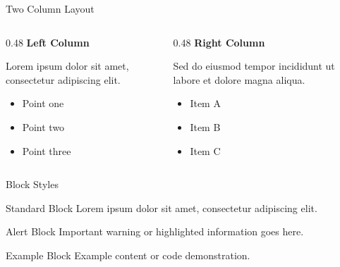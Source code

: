 \documentclass[aspectratio=169]{beamer}
\begin{document}
\begin{frame}{Two Column Layout}
  
  \begin{columns}[T]
    \begin{column}{0.48\textwidth}
      \textbf{Left Column}
      
      Lorem ipsum dolor sit amet, consectetur adipiscing elit.
      
      \begin{itemize}
        \item Point one
        \item Point two
        \item Point three
      \end{itemize}
    \end{column}
    \begin{column}{0.48\textwidth}
      \textbf{Right Column}
      
      Sed do eiusmod tempor incididunt ut labore et dolore magna aliqua.
      
      \begin{itemize}
        \item Item A
        \item Item B
        \item Item C
      \end{itemize}
    \end{column}
  \end{columns}
  
\end{frame}


\begin{frame}{Block Styles}
  
  \begin{block}{Standard Block}
    Lorem ipsum dolor sit amet, consectetur adipiscing elit.
  \end{block}
  
  \begin{alertblock}{Alert Block}
    Important warning or highlighted information goes here.
  \end{alertblock}
  
  \begin{exampleblock}{Example Block}
    Example content or code demonstration.
  \end{exampleblock}
  
\end{frame}
\end{document}
